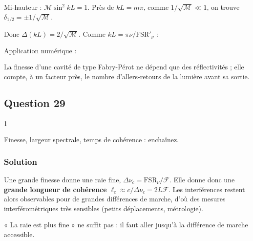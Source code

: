 \documentclass[11pt,a4paper]{article}
\newcommand{\equationajustee}[1]{%
  \sbox{\boiteequation}{$\displaystyle #1$}%
  \ifdim\wd\boiteequation>\linewidth
    \[\resizebox{\linewidth}{!}{\usebox{\boiteequation}}\]%
  \else
    \[#1\]%
  \fi}
\begin{document}
Mi-hauteur : \(\mathcal M\sin^2kL=1\). Près de \(kL=m\pi\), comme \(1/\sqrt{\mathcal M}\ll1\), on trouve \(\delta_{1/2}=\pm1/\sqrt{\mathcal M}\).

Donc \(\Delta(kL)=2/\sqrt{\mathcal M}\). Comme \(kL=\pi\nu/\mathrm{FSR}'_\nu\) :

\equationajustee{\boxed{\begin{aligned}
\mathcal F&=\frac{\pi}{\Delta(kL)}\\
&=\frac{\pi\sqrt{\mathcal M}}{2}\\
&=\frac{\pi R^{1/4}}{1-\sqrt R}
\end{aligned}}}

Application numérique :

\equationajustee{\boxed{\mathcal F\approx154}}

\begin{methode}

La finesse d'une cavité de type Fabry-Pérot ne dépend que des réflectivités ; elle compte, à un facteur près, le nombre d'allers-retours de la lumière avant sa sortie.

\end{methode}

\hypertarget{question-29}{%
\subsection{Question 29}\label{question-29}}

\begin{indication}{1}

Finesse, largeur spectrale, temps de cohérence : enchaînez.

\end{indication}

\hypertarget{solution-28}{%
\subsubsection{Solution}\label{solution-28}}

Une grande finesse donne une raie fine, \(\Delta\nu_c={\mathrm{FSR}}_\nu/\mathcal F\). Elle donne donc une \textbf{grande longueur de cohérence} \(\ell_c\approx c/\Delta\nu_c=2L\mathcal F\). Les interférences restent alors observables pour de grandes différences de marche, d'où des mesures interférométriques très sensibles (petits déplacements, métrologie).

\begin{piege}

« La raie est plus fine » ne suffit pas : il faut aller jusqu'à la différence de marche accessible.

\end{piege}
\end{document}
